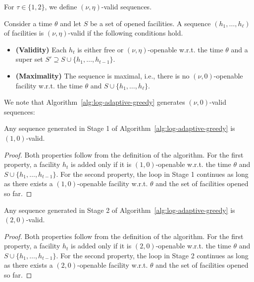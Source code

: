 For $\tau \in \{1, 2\}$, we define $(\nu,\eta)$-valid sequences.
\begin{definition}
\label{def:valid-sequence-eta}
Consider a time $\theta$ and let $S$ be a set of opened facilities. 
A sequence $(h_1, \ldots, h_{\ell})$ of facilities is $(\nu,\eta)$-valid if the following conditions hold.
\begin{itemize}
    \item \textbf{(Validity)} Each $h_t$ is either free or $(\nu,\eta)$-openable w.r.t. the time $\theta$ and a super set $S' \supseteq S \cup \{h_1, \ldots, h_{t-1}\}$.
    \item \textbf{(Maximality)} The sequence is maximal, i.e., there is no $(\nu,0)$-openable facility w.r.t. the time $\theta$ and $S \cup \{h_1, \ldots, h_{\ell}\}$.
\end{itemize}
\end{definition}

We note that Algorithm~\ref{alg:log-adaptive-greedy} generates $(\nu,0)$-valid sequences:

\begin{lemma}
\label{lem:log-valid-1}
Any sequence generated in Stage 1 of Algorithm~\ref{alg:log-adaptive-greedy} is $(1,0)$-valid.
\end{lemma}
\begin{proof}
Both properties follow from the definition of the algorithm.
For the first property, a facility $h_t$ is added only if it is $(1,0)$-openable w.r.t. the time $\theta$ and $S \cup \{h_1, \ldots, h_{t - 1}\}$.
For the second property, the loop in Stage 1 continues as long as there exists a $(1,0)$-openable facility w.r.t. $\theta$ and the set of facilities opened so far.
\end{proof}

\begin{lemma}
\label{lem:log-valid-2}
Any sequence generated in Stage 2 of Algorithm~\ref{alg:log-adaptive-greedy} is $(2,0)$-valid.
\end{lemma}
\begin{proof}
Both properties follow from the definition of the algorithm.
For the first property, a facility $h_t$ is added only if it is $(2,0)$-openable w.r.t. the time $\theta$ and $S \cup \{h_1, \ldots, h_{t - 1}\}$.
For the second property, the loop in Stage 2 continues as long as there exists a $(2,0)$-openable facility w.r.t. $\theta$ and the set of facilities opened so far.
\end{proof}

